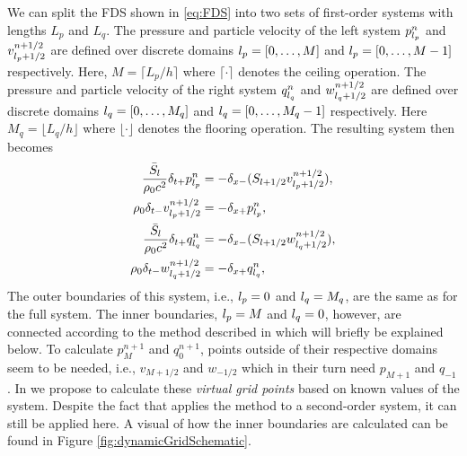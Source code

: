 We can split the FDS shown in \eqref{eq:FDS} into two sets of first-order systems with lengths $L_p$ and $L_q$. The pressure and particle velocity of the left system $p_{l_p}^n$ and $v_{{l_p}+1/2}^{n+1/2}$ are defined over discrete domains ${l_p} = [0, \hdots, M]$ and ${l_p} = [0, \hdots, M-1]$ respectively. Here, $M = \lceil L_p/h\rceil$ where $\lceil \cdot \rceil$ denotes the ceiling operation. The pressure and particle velocity of the right system $q_{l_q}^n$ and $w_{{l_q}+1/2}^{n+1/2}$ are defined over discrete domains ${l_q} = [0, \hdots, M_q]$ and ${l_q} = [0, \hdots, M_q-1]$ respectively. Here $M_q = \lfloor L_q/h\rfloor$ where $\lfloor \cdot \rfloor$ denotes the flooring operation. The resulting system then becomes
\begin{subequations}
    \begin{align}
        \frac{\bar S_{l}}{\rho_0 c^2}\delta_{t+}p_{l_p}^n &= -\delta_{x-}(S_{{l}+1/2}v_{{l_p}+1/2}^{n+1/2}),\label{eq:discPressureP}\\
        \rho_0 \delta_{t-}v_{{l_p}+1/2}^{n+1/2}&=-\delta_{x+}p_{l_p}^n,\label{eq:discVelocityV}\\
        \frac{\bar S_{l}}{\rho_0 c^2}\delta_{t+}q_{l_q}^n &= -\delta_{x-}(S_{{l}+1/2}w_{{l_q}+1/2}^{n+1/2}),\label{eq:discPressureP}\\
        \rho_0 \delta_{t-}w_{{l_q}+1/2}^{n+1/2}&=-\delta_{x+}q_{l_q}^n,\label{eq:discVelocityV}
    \end{align}
\end{subequations}
The outer boundaries of this system, i.e., ${l_p} = 0$ and ${l_q} = M_q$, are the same as for the full system. The inner boundaries, ${l_p} = M$ and ${l_q} = 0$, however, are connected according to the method described in \cite{Willemsen2021} which will briefly be explained below. To calculate $p_M^{n+1}$ and $q_0^{n+1}$, points outside of their respective domains seem to be needed, i.e., $v_{M+1/2}$ and $w_{-1/2}$ which in their turn need $p_{M+1}$ and $q_{-1}$. In \cite{Willemsen2021} we propose to calculate these \textit{virtual grid points} based on known values of the system. Despite the fact that \cite{Willemsen2021} applies the method to a second-order system, it can still be applied here. A visual of how the inner boundaries are calculated can be found in Figure \ref{fig:dynamicGridSchematic}.

